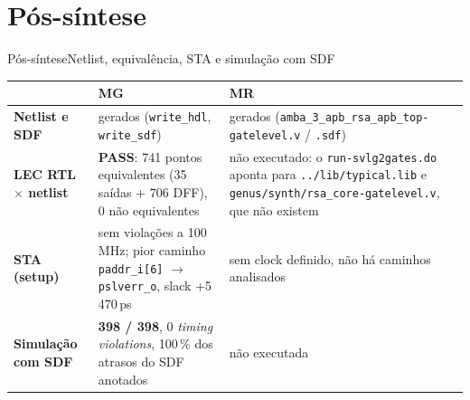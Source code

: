 \documentclass[aspectratio=169,10pt,t]{beamer}
\newcommand{\MG}{\textbf{\color{tmCafe}MG}}
\newcommand{\MR}{\textbf{\color{tmVermelho}MR}}
\begin{document}
\section{Pós-síntese}
\begin{frame}{Pós-síntese}{Netlist, equivalência, STA e simulação com SDF}
  \footnotesize
  \renewcommand{\arraystretch}{1.22}
  \begin{tabularx}{\textwidth}{@{}>{\bfseries}p{2.9cm} >{\raggedright\arraybackslash}X >{\raggedright\arraybackslash}X@{}}
    \toprule
     & \MG & \MR \\
    \midrule
    Netlist e SDF & gerados (\texttt{write\_hdl}, \texttt{write\_sdf}) & gerados (\texttt{amba\_3\_apb\_rsa\_apb\_top-gatelevel.v} / \texttt{.sdf}) \\
    LEC RTL $\times$ netlist & \textbf{PASS}: 741 pontos equivalentes (35 saídas + 706 DFF), 0 não equivalentes & não executado: o \texttt{run-svlg2gates.do} aponta para \texttt{../lib/typical.lib} e \texttt{genus/synth/rsa\_core-gatelevel.v}, que não existem \\
    STA (setup) & sem violações a 100\,MHz; pior caminho \texttt{paddr\_i[6]} $\rightarrow$ \texttt{pslverr\_o}, slack +5\,470\,ps & sem clock definido, não há caminhos analisados \\
    Simulação com SDF & \textbf{398 / 398}, 0 \emph{timing violations}, 100\,\% dos atrasos do SDF anotados & não executada \\
    \bottomrule
  \end{tabularx}
\end{frame}

\end{document}
